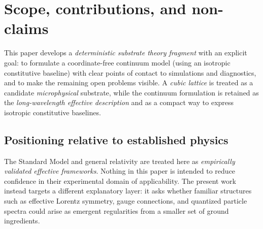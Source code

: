 \section{Scope, contributions, and non-claims}
\label{sec:scope}

This paper develops a \emph{deterministic substrate theory fragment} with an explicit goal:
to formulate a coordinate-free continuum model (using an isotropic constitutive baseline) with clear points of contact to simulations and diagnostics,
and to make the remaining open problems visible.
A \emph{cubic lattice} is treated as a candidate \emph{microphysical} substrate, while the continuum formulation is
retained as the \emph{long-wavelength effective description} and as a compact way to express isotropic constitutive
baselines.

\subsection{Positioning relative to established physics}
The Standard Model and general relativity are treated here as \emph{empirically validated effective frameworks}.
Nothing in this paper is intended to reduce confidence in their experimental domain of applicability.
The present work instead targets a different explanatory layer: it asks whether familiar structures such as
effective Lorentz symmetry, gauge connections, and quantized particle spectra could arise as emergent regularities
from a smaller set of ground ingredients.

